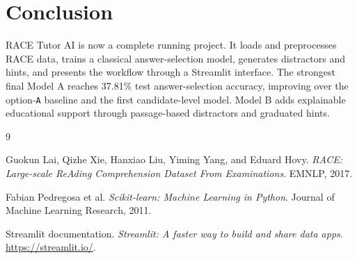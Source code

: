 \documentclass[12pt,a4paper]{article}
\begin{document}
\section{Conclusion}

RACE Tutor AI is now a complete running project. It loads and preprocesses RACE
data, trains a classical answer-selection model, generates distractors and
hints, and presents the workflow through a Streamlit interface. The strongest
final Model A reaches 37.81\% test answer-selection accuracy, improving over
the option-\texttt{A} baseline and the first candidate-level model. Model B
adds explainable educational support through passage-based distractors and
graduated hints.

\begin{thebibliography}{9}

Guokun Lai, Qizhe Xie, Hanxiao Liu, Yiming Yang, and Eduard Hovy.
\textit{RACE: Large-scale ReAding Comprehension Dataset From Examinations}.
EMNLP, 2017.

Fabian Pedregosa et al.
\textit{Scikit-learn: Machine Learning in Python}.
Journal of Machine Learning Research, 2011.

Streamlit documentation.
\textit{Streamlit: A faster way to build and share data apps}.
\url{https://streamlit.io/}.

\end{thebibliography}
\end{document}
